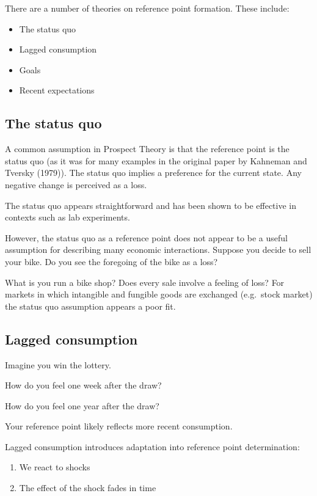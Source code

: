 \documentclass[
  letterpaper,
  DIV=11,
  numbers=noendperiod]{scrreprt}
\providecommand{\tightlist}{%
  \setlength{\itemsep}{0pt}\setlength{\parskip}{0pt}}\usepackage{longtable,booktabs,array}
\begin{document}
There are a number of theories on reference point formation. These
include:

\begin{itemize}
\tightlist
\item
  The status quo
\item
  Lagged consumption
\item
  Goals
\item
  Recent expectations
\end{itemize}

\hypertarget{the-status-quo}{%
\subsection{The status quo}\label{the-status-quo}}

A common assumption in Prospect Theory is that the reference point is
the status quo (as it was for many examples in the original paper by
Kahneman and Tversky (1979)). The status quo implies a preference for
the current state. Any negative change is perceived as a loss.

The status quo appears straightforward and has been shown to be
effective in contexts such as lab experiments.

However, the status quo as a reference point does not appear to be a
useful assumption for describing many economic interactions. Suppose you
decide to sell your bike. Do you see the foregoing of the bike as a
loss?

What is you run a bike shop? Does every sale involve a feeling of loss?
For markets in which intangible and fungible goods are exchanged
(e.g.~stock market) the status quo assumption appears a poor fit.

\hypertarget{lagged-consumption}{%
\subsection{Lagged consumption}\label{lagged-consumption}}

Imagine you win the lottery.

How do you feel one week after the draw?

How do you feel one year after the draw?

Your reference point likely reflects more recent consumption.

Lagged consumption introduces adaptation into reference point
determination:

\begin{enumerate}
\def\labelenumi{\arabic{enumi}.}
\tightlist
\item
  We react to shocks
\item
  The effect of the shock fades in time
\end{enumerate}
\end{document}
